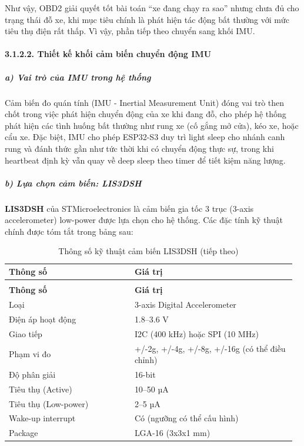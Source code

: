 \documentclass[a4paper]{extarticle}
\newcommand{\thesissettableid}[2]{%
  \renewcommand{\thetable}{#1}%
  \renewcommand{\theHtable}{#2}%
}
\begin{document}
Như vậy, OBD2 giải quyết tốt bài toán ``xe đang chạy ra sao'' nhưng
chưa đủ cho trạng thái đỗ xe, khi mục tiêu chính là phát hiện tác động
bất thường với mức tiêu thụ điện rất thấp. Vì vậy, phần tiếp theo chuyển
sang khối IMU.

\paragraph{3.1.2.2. Thiết kế khối cảm biến chuyển động
IMU}\label{3212-thiux1ebft-kux1ebf-muxf4-ux111un-cux1ea3m-biux1ebfn-chuyux1ec3n-ux111ux1ed9ng-imu}

\subparagraph{a) Vai trò của IMU trong hệ
thống}\label{a-vai-truxf2-cux1ee7a-imu-trong-hux1ec7-thux1ed1ng}

Cảm biến đo quán tính (IMU - Inertial Measurement Unit) đóng vai trò
then chốt trong việc phát hiện chuyển động của xe khi đang đỗ, cho phép
hệ thống phát hiện các tình huống bất thường như rung xe (cố gắng mở
cửa), kéo xe, hoặc cẩu xe. Đặc biệt, IMU cho phép ESP32-S3 duy trì
light sleep cho nhánh canh rung và đánh thức gần như tức thời khi có chuyển động thực sự,
trong khi heartbeat định kỳ vẫn quay về deep sleep theo timer để tiết kiệm năng lượng.

\subparagraph{b) Lựa chọn cảm biến:
LIS3DSH}\label{b-lux1ef1a-chux1ecdn-cux1ea3m-biux1ebfn-LIS3DH}

\textbf{LIS3DSH} của STMicroelectronics là cảm biến gia tốc 3 trục
(3-axis accelerometer) low-power được lựa chọn cho hệ thống. Các đặc
tính kỹ thuật chính được tóm tắt trong bảng sau:


{\thesissettableid{3.7}{tab-ch3-thong-so-ky-thuat-cam-bien-LIS3DH}
\def\LTcaptype{table}
\begin{longtable}{|L{0.426\linewidth}|L{0.542\linewidth}|}
\caption{Thông số kỹ thuật cảm biến LIS3DSH}\label{tab:ch3-thong-so-ky-thuat-cam-bien-LIS3DH}\\
\hline \textbf{Thông số} & \textbf{Giá trị} \\
\hline
\endfirsthead
\caption[]{Thông số kỹ thuật cảm biến LIS3DSH (tiếp theo)}\\
\hline \textbf{Thông số} & \textbf{Giá trị} \\
\hline
\endhead
\hline
\endfoot
\endlastfoot
Loại & 3-axis Digital Accelerometer \\\hline
Điện áp hoạt động & 1.8--3.6 V \\\hline
Giao tiếp & I2C (400 kHz) hoặc SPI (10 MHz) \\\hline
Phạm vi đo & +/-2g, +/-4g, +/-8g, +/-16g (có thể điều chỉnh) \\\hline
Độ phân giải & 16-bit \\\hline
Tiêu thụ (Active) & 10--50 µA \\\hline
Tiêu thụ (Low-power) & 2--5 µA \\\hline
Wake-up interrupt & Có (ngưỡng có thể cấu hình) \\\hline
Package & LGA-16 (3x3x1 mm) \\\hline
\end{longtable}
}
\end{document}
